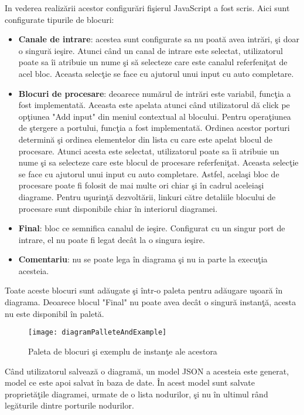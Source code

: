 In vederea realizării acestor configurări fişierul JavaScript  a fost scris. Aici sunt configurate tipurile de blocuri:
\begin{itemize}
	\item \textbf{Canale de intrare}: acestea sunt configurate sa nu poată avea intrări, şi doar o singură ieşire. Atunci când un canal de intrare este selectat, utilizatorul poate sa îi atribuie un nume şi să selecteze care este canalul referfeniţat de acel bloc. Aceasta selecţie se face cu ajutorul unui input cu auto completare.
	\item \textbf{Blocuri de procesare}: deoarece numărul de intrări este variabil, funcţia   a fost implementată. Aceasta este apelata atunci când utilizatorul dă click pe opţiunea "Add input" din meniul contextual al blocului. Pentru operaţiunea de ştergere a portului, funcţia  a fost implementată. Ordinea acestor porturi determină şi ordinea elementelor din lista cu care este apelat blocul de procesare. Atunci acesta este selectat, utilizatorul poate sa îi atribuie un nume şi sa selecteze care este blocul de procesare referfeniţat. Aceasta selecţie se face cu ajutorul unui input cu auto completare. Astfel, acelaşi bloc de procesare poate fi folosit de mai multe ori chiar şi în cadrul aceleiaşi diagrame. Pentru uşurinţă dezvoltării, linkuri către detaliile blocului de procesare sunt disponibile chiar în interiorul diagramei.
	\item \textbf{Final}: bloc ce semnifica canalul de ieşire. Configurat cu un singur port de intrare, el nu poate fi legat decât la o singura ieşire.
	\item \textbf{Comentariu}: nu se poate lega în diagrama şi nu ia parte la execuţia acesteia. 
\end{itemize}
Toate aceste blocuri sunt adăugate şi într-o paleta pentru adăugare uşoară în diagrama. Deoarece blocul "Final" nu poate avea decât o singură instanţă, acesta nu este disponibil în paletă.
\begin{figure}[H]
	\centering
	\texttt{[image: diagramPalleteAndExample]}
	\caption{Paleta de blocuri şi exemplu de instanţe ale acestora}
	\label{fig:diagramPalleteAndExample}
\end{figure}
Când utilizatorul salvează o diagramă, un model JSON a acesteia este generat, model ce este apoi salvat în baza de date. În acest model sunt salvate proprietăţile diagramei, urmate de o lista nodurilor, şi nu în ultimul rând legăturile dintre porturile nodurilor.

